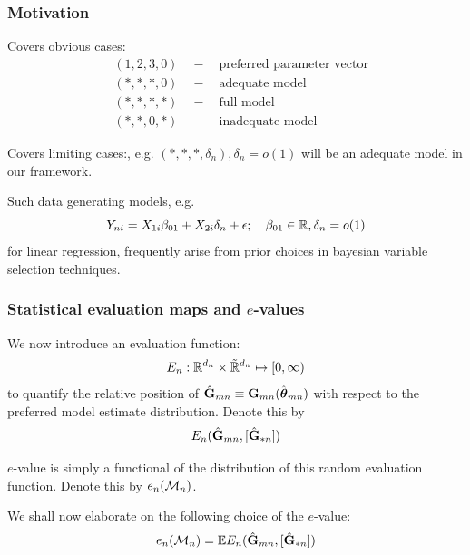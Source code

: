 \documentclass[handout,10pt]{beamer}
\begin{document}

\begin{frame}
\frametitle{Motivation}

{\colbbf Covers obvious cases:} 
%
\begin{align*}
& (1, 2, 3, 0) \quad - \quad \text{preferred parameter vector}\\
& (*, *, *, 0) \quad - \quad \text{adequate model}\\
& (*, *, *, *) \quad - \quad \text{full model}\\
& (*, *, 0, *) \quad - \quad \text{inadequate model}
\end{align*}

\vspace{1em}
{\colbbf Covers limiting cases:}, e.g. $(*, *, *, \delta_n), \delta_n = o(1)$ will be an adequate model in our framework.
%
$$ 
$$
%

Such data generating models, e.g.
$$
Y_{ni} = X_{1i} \beta_{01} + X_{2i} \delta_n + \epsilon; \quad \beta_{01} \in {\mathbb{R}}, \delta_n = o(1)
$$
for linear regression, frequently arise from prior choices in bayesian variable selection techniques.
\end{frame}


\begin{frame}
\frametitle{Statistical evaluation maps and $e$-values}
We now introduce an {\colbit evaluation function}:
%
$$
E_n: {\mathbb{R}}^{d_n} \times \tilde {{\mathbb{R}}}^{d_n} \mapsto [0, \infty)
$$
%
to quantify the relative position of $\hat {{\mathbf{G}}}_{m n} \equiv {\mathbf{G}}_{m n} ( \hat {{\boldsymbol{\theta}}}_{m n})$ with respect to the preferred model estimate distribution. Denote this by
%
$$
E_n ( \hat {{\mathbf{G}}}_{m n}, [\hat {{\mathbf{G}}}_{* n}])
$$

{\colbbf $e$-value} is simply a functional of the distribution of this random evaluation function. Denote this by $e_n ({\cal{M}}_n)$.

\vspace{1em}
We shall now elaborate on the following choice of the $e$-value:
%
$$
e_n ({\cal{M}}_n) = {\mathbb{E}} E_n ( \hat {{\mathbf{G}}}_{m n}, [\hat {{\mathbf{G}}}_{* n}])
$$

\end{frame}

%
\end{document}
